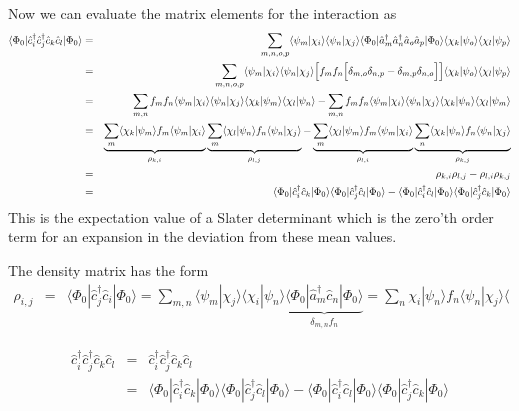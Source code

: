 \documentclass[11pt,a4paper]{report}
\begin{document}
Now we can evaluate the matrix elements for the interaction as
\begin{eqnarray}
\langle\Phi_0|\hat{c}^\dagger_i\hat{c}^\dagger_j\hat{c}_k\hat{c}_l|\Phi_0\rangle
&=&\sum_{m,n,o,p}\langle\psi_m|\chi_i\rangle\langle\psi_n|\chi_j\rangle
\langle\Phi_0|\hat{a}^\dagger_m\hat{a}^\dagger_n\hat{a}_o\hat{a}_p|\Phi_0\rangle
\langle\chi_k|\psi_o\rangle\langle\chi_l|\psi_p\rangle
\nonumber\\
&=&\sum_{m,n,o,p}\langle\psi_m|\chi_i\rangle\langle\psi_n|\chi_j\rangle
\Bigl[
f_mf_n\Bigl[\delta_{m,o}\delta_{n,p}-\delta_{m,p}\delta_{n,o}\Bigr]
\Bigr]
\langle\chi_k|\psi_o\rangle\langle\chi_l|\psi_p\rangle
\nonumber\\
&=&
\sum_{m,n}
f_mf_n
\langle\psi_m|\chi_i\rangle\langle\psi_n|\chi_j\rangle
\langle\chi_k|\psi_m\rangle\langle\chi_l|\psi_n\rangle
-
\sum_{m,n}
f_mf_n
\langle\psi_m|\chi_i\rangle\langle\psi_n|\chi_j\rangle
\langle\chi_k|\psi_n\rangle\langle\chi_l|\psi_m\rangle
\nonumber\\
&=&
\underbrace{\sum_{m}
\langle\chi_k|\psi_m\rangle f_m
\langle\psi_m|\chi_i\rangle}_{\rho_{k,i}}
\underbrace{\sum_{m}
\langle\chi_l|\psi_n\rangle f_n\langle\psi_n|\chi_j\rangle 
}_{\rho_{l,j}}
-
\underbrace{\sum_{m}
\langle\chi_l|\psi_m\rangle f_m\langle\psi_m|\chi_i\rangle}_{\rho_{l,i}}
\underbrace{\sum_{n}
\langle\chi_k|\psi_n\rangle f_n\langle\psi_n|\chi_j\rangle}_{\rho_{k,j}}
\nonumber\\
&=&\rho_{k,i}\rho_{l,j}-\rho_{l,i}\rho_{k,j}
\nonumber\\
&=&
\langle\Phi_0|\hat{c}^\dagger_i\hat{c}_k|\Phi_0\rangle
\langle\Phi_0|\hat{c}^\dagger_j\hat{c}_l|\Phi_0\rangle
-\langle\Phi_0|\hat{c}^\dagger_i\hat{c}_l|\Phi_0\rangle
\langle\Phi_0|\hat{c}^\dagger_j\hat{c}_k|\Phi_0\rangle
\end{eqnarray}
This is the expectation value of a Slater determinant which is the
zero'th order term for an expansion in the deviation from these mean
values.


The density matrix has the form
\begin{eqnarray}
\rho_{i,j}&=&\langle\Phi_0|\hat{c}^\dagger_j\hat{c}_{i}|\Phi_0\rangle
=\sum_{m,n}\langle\psi_m|\chi_j\rangle\langle\chi_i|\psi_n\rangle
\underbrace{\langle\Phi_0|\hat{a}^\dagger_m\hat{c}_{n}|\Phi_0\rangle}_{\delta_{m,n}f_n}
=\sum_{n}\chi_i|\psi_n\rangle f_n\langle\psi_n|\chi_j\rangle\langle
\end{eqnarray}



\begin{eqnarray}
\hat{c}^\dagger_i\hat{c}^\dagger_j\hat{c}_k\hat{c}_l
&=&\hat{c}^\dagger_i\hat{c}^\dagger_j\hat{c}_k\hat{c}_l
\nonumber\\
&=&
\langle\Phi_0|\hat{c}^\dagger_i\hat{c}_k|\Phi_0\rangle
\langle\Phi_0|\hat{c}^\dagger_j\hat{c}_l|\Phi_0\rangle
-\langle\Phi_0|\hat{c}^\dagger_i\hat{c}_l|\Phi_0\rangle
\langle\Phi_0|\hat{c}^\dagger_j\hat{c}_k|\Phi_0\rangle
\end{eqnarray}
\end{document}

